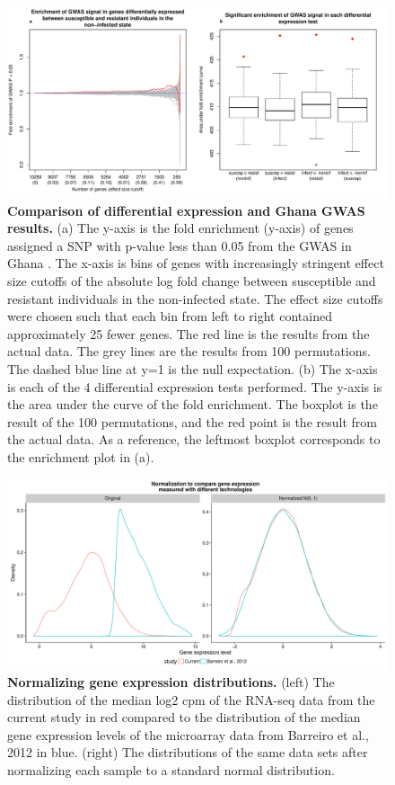 \begin{figure}[!htb]
\centering \includegraphics[width=5in]{img/ch03/gwas-supp.pdf}
\caption[Comparison of differential expression and Ghana GWAS
  results.]{ \textbf{Comparison of differential expression and Ghana
    GWAS results.} (a) The y-axis is the fold enrichment (y-axis) of
  genes assigned a SNP with p-value less than 0.05 from the GWAS in
  Ghana \citep{Thye2010}. The x-axis is bins of genes with
  increasingly stringent effect size cutoffs of the absolute log fold
  change between susceptible and resistant individuals in the
  non-infected state. The effect size cutoffs were chosen such that
  each bin from left to right contained approximately 25 fewer
  genes. The red line is the results from the actual data. The grey
  lines are the results from 100 permutations. The dashed blue line at
  y=1 is the null expectation. (b) The x-axis is each of the 4
  differential expression tests performed. The y-axis is the area
  under the curve of the fold enrichment. The boxplot is the result of
  the 100 permutations, and the red point is the result from the
  actual data. As a reference, the leftmost boxplot corresponds to the
  enrichment plot in (a).  }
\label{fig:gwas-supp}
\end{figure}

\begin{figure}[!htb]
\centering
\includegraphics[width=5in]{img/ch03/combined-distributions.pdf}
\caption[Normalizing gene expression distributions.]{
  \textbf{Normalizing gene expression distributions.} (left) The
  distribution of the median log2 cpm of the RNA-seq data from the
  current study in red compared to the distribution of the median gene
  expression levels of the microarray data from Barreiro et al., 2012
  \citep{Barreiro2012} in blue. (right) The distributions of the same
  data sets after normalizing each sample to a standard normal
  distribution.  }
\label{fig:combined-dist}
\end{figure}


